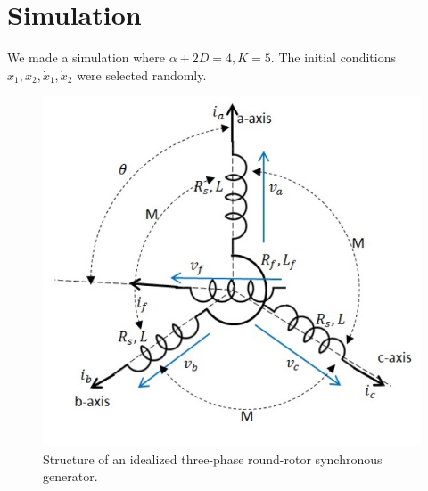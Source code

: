 \documentclass[10pt,onecolumn,twoside,letter]{IEEEtran}
\theoremstyle{plain}
\begin{document}
\section{Simulation}\label{sec:Simulation}
We made a simulation where $\alpha+2D = 4,  K = 5$. The initial conditions $x_1, x_2, \dot x_1,\dot x_2$ were selected randomly.
%
\begin{figure}
\begin{centering}
\includegraphics[scale=0.65]{FIG1} 
\par\end{centering}
\caption{\label{fig:Struct}Structure of an idealized three-phase
round-rotor synchronous generator.}
\end{figure}



\end{document}

